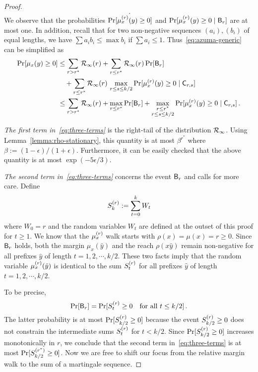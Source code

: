 \begin{proof}
\begin{align*}
    \, .
\end{align*} 
We observe that the probabilities $\Pr[\mu_x^{(r)}(y) \geq 0]$ and $\Pr[\mu_x^{(r)}(y) \geq 0 \mid \mathsf{B}_r]$ are at most one. 
In addition, recall that for two non-negative sequences $(a_i), (b_i)$ of equal lengths, 
we have $\sum{a_i b_i} \leq \max b_i$ if $\sum{a_i} \leq 1$. 
Thus~\eqref{eq:azuma-generic} can be simplified as
\begin{align}\label{eq:three-terms}
\Pr[\mu_x(y) \geq 0] 
 &\leq 
    \sum_{r > r^*}{\mathcal{R}_\infty(r)} 
  + \sum_{r \leq r^*}{\mathcal{R}_\infty(r) \Pr[\mathsf{B}_r]} \nonumber \\
  &\quad+ \sum_{r \leq r^*}{\mathcal{R}_\infty(r)\, \max_{r \leq s \leq k/2}{\Pr[\mu_x^{(r)}(y) \geq 0 \mid \mathsf{C}_{r,s}]} }
  \nonumber \\
 &\leq    
      \sum_{r > r^*}{\mathcal{R}_\infty(r)}            
  + 
      \max_{r \leq r^*}{\Pr[\mathsf{B}_r]}          
  + 
      \max_{\substack{r \leq r^* \\ r \leq s \leq k/2}}{\Pr[\mu_x^{(r)}(y) \geq 0 \mid \mathsf{C}_{r,s}]}   
\, .
\end{align}


\emph{The first term in~\eqref{eq:three-terms} } is the right-tail of the distribution $\mathcal{R}_\infty$. 
Using Lemma~\ref{lemma:rho-stationary}, 
this quantity is at most $\beta^{r^*}$ where $\beta := (1-\epsilon)/(1+\epsilon)$. 
Furthermore, it can be easily checked that the above quantity is at most $\exp(-5 \epsilon/3)$.

\emph{The second term in~\eqref{eq:three-terms} } concerns the event
$\mathsf{B}_r$ and calls for more care.  Define
\[
  S_k^{(r)} := \sum_{t=0}^k {W_t}
\]
where $W_0 = r$ and the random variables $W_t$ are defined at the
outset of this proof for $t \geq 1$.  We know that the $\mu_x^{(r)}$ walk
starts with $\rho(x) = \mu(x) = r \geq 0$.  Since $\mathsf{B}_r$ holds,
both the margin $\mu_x(\hat{y})$ and the reach $\rho(x\hat{y})$ remain
non-negative for all prefixes $\hat{y}$ of length
$t = 1, 2, \cdots, k/2$.  These two facts imply that the random
variable $\mu_x^{(r)}(\hat{y})$ is identical to the sum $S^{(r)}_t$ for all
prefixes $\hat{y}$ of length $t = 1, 2, \cdots, k/2$.

To be precise,
\[
  \Pr[\mathsf{B}_r] = \Pr[S^{(r)}_t \geq 0 \quad \text{for all } t \leq k/2]\,.
\]
The latter probability is at most $\Pr[S^{(r)}_{k/2} \geq 0]$ because the
event $S^{(r)}_{k/2} \geq 0$ does not constrain the intermediate sums
$S^{(r)}_t$ for $t < k/2$.  Since $\Pr[S^{(r)}_{k/2} \geq 0]$ increases
monotonically in $r$, we conclude that the second term
in~\eqref{eq:three-terms} is at most $\Pr[S^{(r^*)}_{k/2} \geq 0]$.  Now
we are free to shift our focus from the relative margin walk to the
sum of a martingale sequence.


\end{proof}
